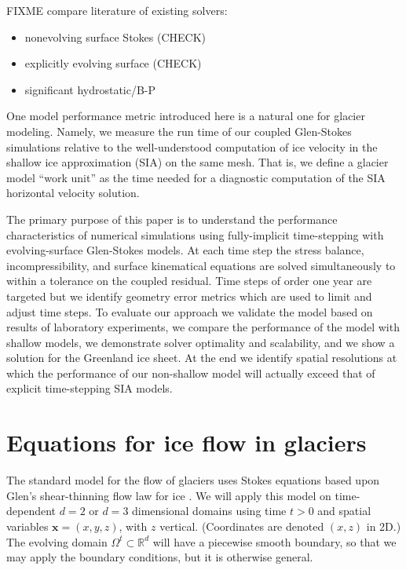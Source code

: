 \documentclass[letterpaper,final,12pt,reqno]{amsart}
\newcommand{\RR}{\mathbb{R}}
\newcommand{\bx}{\mathbf{x}}
\begin{document}
FIXME compare literature of existing solvers:
\begin{itemize}
\item  nonevolving surface Stokes \cite{IsaacStadlerGhattas2015,Lengetal2013,Lengetal2014a,Zwingeretal2007} (CHECK)
\item  explicitly evolving surface \cite{Gudmundsson1999,HelanowAhlkrona2018,Jouvetetal2008,Larouretal2012,
Lengetal2014b,Lengetal2012,LeysingerGudmundsson2004,PralongFunk2004,Seddiketal2012} (CHECK)
\item significant hydrostatic/B-P \cite{BrownSmithAhmadia2013,Tuminaroetal2016}
\end{itemize}

One model performance metric introduced here is a natural one for glacier modeling.  Namely, we measure the run time of our coupled Glen-Stokes simulations relative to the well-understood computation of ice velocity in the shallow ice approximation (SIA) \cite{Fowler1997} on the same mesh.  That is, we define a glacier model ``work unit'' as the time needed for a diagnostic computation of the SIA horizontal velocity solution.

The primary purpose of this paper is to understand the performance characteristics of numerical simulations using fully-implicit time-stepping with evolving-surface Glen-Stokes models.  At each time step the stress balance, incompressibility, and surface kinematical equations are solved simultaneously to within a tolerance on the coupled residual.  Time steps of order one year are targeted but we identify geometry error metrics which are used to limit and adjust time steps.  To evaluate our approach we validate the model based on results of laboratory experiments, we compare the performance of the model with shallow models, we demonstrate solver optimality and scalability, and we show a solution for the Greenland ice sheet.  At the end we identify spatial resolutions at which the performance of our non-shallow model will actually exceed that of explicit time-stepping SIA models.


\section{Equations for ice flow in glaciers} \label{sec:strongform}

The standard model for the flow of glaciers uses Stokes equations based upon Glen's shear-thinning flow law for ice \cite{GreveBlatter2009,JouvetRappaz2011,SchoofHewitt2013}.  We will apply this model on time-dependent $d=2$ or $d=3$ dimensional domains using time $t>0$ and spatial variables $\bx=(x,y,z)$, with $z$ vertical.  (Coordinates are denoted $(x,z)$ in 2D.)  The evolving domain $\Omega^t \subset \RR^d$ will have a piecewise smooth boundary, so that we may apply the boundary conditions, but it is otherwise general.
\end{document}
